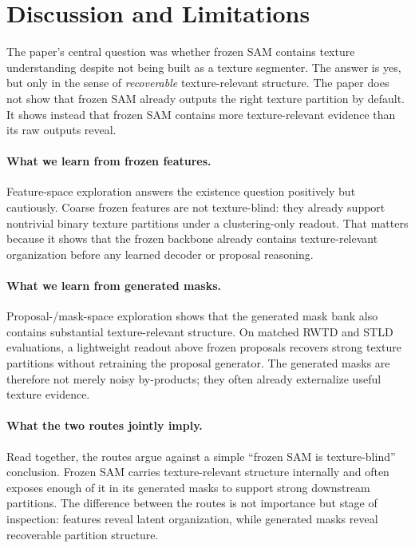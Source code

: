 \section{Discussion and Limitations}
\label{sec:discussion}

The paper's central question was whether frozen SAM contains texture understanding despite not being built as a texture segmenter. The answer is yes, but only in the sense of \emph{recoverable} texture-relevant structure. The paper does not show that frozen SAM already outputs the right texture partition by default. It shows instead that frozen SAM contains more texture-relevant evidence than its raw outputs reveal.

\paragraph{What we learn from frozen features.} Feature-space exploration answers the existence question positively but cautiously. Coarse frozen features are not texture-blind: they already support nontrivial binary texture partitions under a clustering-only readout. That matters because it shows that the frozen backbone already contains texture-relevant organization before any learned decoder or proposal reasoning.

\paragraph{What we learn from generated masks.} Proposal-/mask-space exploration shows that the generated mask bank also contains substantial texture-relevant structure. On matched RWTD and STLD evaluations, a lightweight readout above frozen proposals recovers strong texture partitions without retraining the proposal generator. The generated masks are therefore not merely noisy by-products; they often already externalize useful texture evidence.

\paragraph{What the two routes jointly imply.} Read together, the routes argue against a simple ``frozen SAM is texture-blind'' conclusion. Frozen SAM carries texture-relevant structure internally and often exposes enough of it in its generated masks to support strong downstream partitions. The difference between the routes is not importance but stage of inspection: features reveal latent organization, while generated masks reveal recoverable partition structure.

